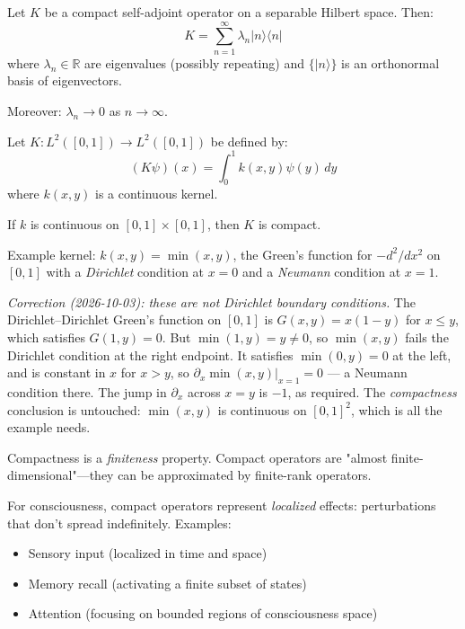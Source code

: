 \begin{theorem}\label{thm:spectral-theorem-compact}
Let $K$ be a compact self-adjoint operator on a separable Hilbert space. Then:
\begin{equation}
K = \sum_{n=1}^\infty \lambda_n |n\rangle\langle n|
\end{equation}
where $\lambda_n \in \mathbb{R}$ are eigenvalues (possibly repeating) and $\{|n\rangle\}$ is an orthonormal basis of eigenvectors.

Moreover: $\lambda_n \to 0$ as $n \to \infty$.
\end{theorem}

\begin{example}\label{ex:integral-operators-compact}
Let $K: L^2([0,1]) \to L^2([0,1])$ be defined by:
\begin{equation}
(K\psi)(x) = \int_0^1 k(x, y) \psi(y) \, dy
\end{equation}
where $k(x,y)$ is a continuous kernel.

If $k$ is continuous on $[0,1] \times [0,1]$, then $K$ is compact.

Example kernel: $k(x,y) = \min(x,y)$, the Green's function for $-d^2/dx^2$ on
$[0,1]$ with a \emph{Dirichlet} condition at $x=0$ and a \emph{Neumann}
condition at $x=1$.

\emph{Correction (2026-10-03): these are not Dirichlet boundary conditions.} The
Dirichlet--Dirichlet Green's function on $[0,1]$ is $G(x,y) = x(1-y)$ for
$x \leq y$, which satisfies $G(1,y) = 0$. But $\min(1,y) = y \neq 0$, so
$\min(x,y)$ fails the Dirichlet condition at the right endpoint. It satisfies
$\min(0,y) = 0$ at the left, and is constant in $x$ for $x > y$, so
$\partial_x \min(x,y)\big|_{x=1} = 0$ --- a Neumann condition there. The jump in
$\partial_x$ across $x = y$ is $-1$, as required. The \emph{compactness}
conclusion is untouched: $\min(x,y)$ is continuous on $[0,1]^2$, which is all the
example needs.
\end{example}

\begin{keyidea}
Compactness is a \textit{finiteness} property. Compact operators are "almost finite-dimensional"---they can be approximated by finite-rank operators.

For consciousness, compact operators represent \textit{localized} effects: perturbations that don't spread indefinitely. Examples:
\begin{itemize}
\item Sensory input (localized in time and space)
\item Memory recall (activating a finite subset of states)
\item Attention (focusing on bounded regions of consciousness space)
\end{itemize}
\end{keyidea}

